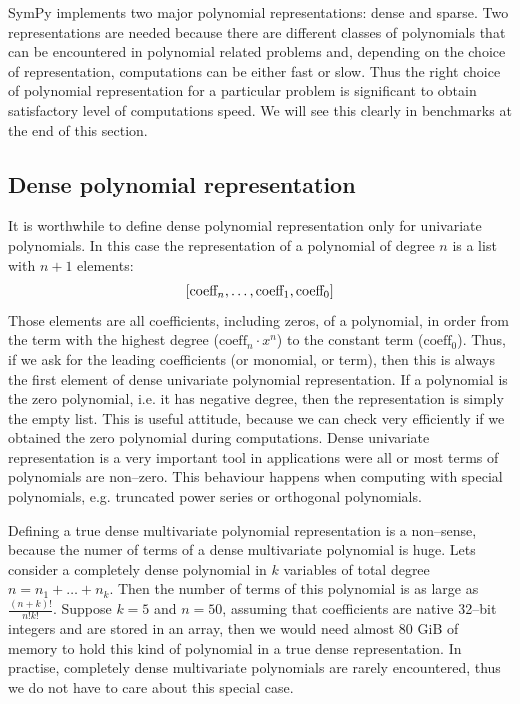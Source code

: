 SymPy implements two major polynomial representations: dense and sparse. Two representations
are needed because there are different classes of polynomials that can be encountered in
polynomial related problems and, depending on the choice of representation, computations can
be either fast or slow. Thus the right choice of polynomial representation for a particular
problem is significant to obtain satisfactory level of computations speed. We will see this
clearly in benchmarks at the end of this section.


\subsection{Dense polynomial representation}

It is worthwhile to define dense polynomial representation only for univariate polynomials.
In this case the representation of a polynomial of degree $n$ is a list with $n+1$ elements:
\begin{gather}
\begin{split}\left[\mbox{coeff}_n, \ldots, \mbox{coeff}_1, \mbox{coeff}_0\right]\end{split}\notag
\end{gather}
Those elements are all coefficients, including zeros, of a polynomial, in order from the term
with the highest degree ($\mbox{coeff}_n \cdot x^n$) to the constant term ($\mbox{coeff}_0$).
Thus, if we ask for the leading coefficients (or monomial, or term), then this is always the first
element of dense univariate polynomial representation. If a polynomial is the zero polynomial, i.e.
it has negative degree, then the representation is simply the empty list. This is useful attitude,
because we can check very efficiently if we obtained the zero polynomial during computations. Dense
univariate representation is a very important tool in applications were all or most terms of polynomials
are non--zero. This behaviour happens when computing with special polynomials, e.g. truncated power
series or orthogonal polynomials.

Defining a true dense multivariate polynomial representation  is a non--sense, because the numer
of terms of a dense multivariate polynomial is huge. Lets consider a completely dense polynomial
in $k$ variables of total degree $n = n_1 + \ldots + n_k$. Then the number of terms of this
polynomial is as large as $\frac{(n + k)!}{n! k!}$. Suppose $k = 5$ and $n = 50$, assuming
that coefficients are native 32--bit integers and are stored in an array, then we would need
almost 80 GiB of memory to hold this kind of polynomial in a true dense representation. In
practise, completely dense multivariate polynomials are rarely encountered, thus we do not
have to care about this special case.

